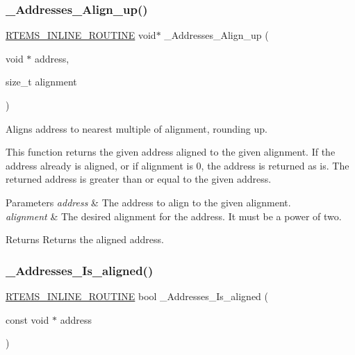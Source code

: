 \subsubsection{\texorpdfstring{\_Addresses\_Align\_up()}{\_Addresses\_Align\_up()}}
{\footnotesize\ttfamily \mbox{\hyperlink{group__RTEMSScoreBaseDefs_gac216239df231d5dbd15e3520b0b9313f}{R\+T\+E\+M\+S\+\_\+\+I\+N\+L\+I\+N\+E\+\_\+\+R\+O\+U\+T\+I\+NE}} void$\ast$ \+\_\+\+Addresses\+\_\+\+Align\+\_\+up (\begin{DoxyParamCaption}\item[{void $\ast$}]{address,  }\item[{size\+\_\+t}]{alignment }\end{DoxyParamCaption})}



Aligns address to nearest multiple of alignment, rounding up. 

This function returns the given address aligned to the given alignment. If the address already is aligned, or if alignment is 0, the address is returned as is. The returned address is greater than or equal to the given address.


\begin{DoxyParams}{Parameters}
{\em address} & The address to align to the given alignment. \\
\hline
{\em alignment} & The desired alignment for the address. It must be a power of two.\\
\hline
\end{DoxyParams}
\begin{DoxyReturn}{Returns}
Returns the aligned address. 
\end{DoxyReturn}
\mbox{\label{group__RTEMSScoreAddress_gac1cff04acb72a4eb262d66f9cd1c4d6d}} 
\subsubsection{\texorpdfstring{\_Addresses\_Is\_aligned()}{\_Addresses\_Is\_aligned()}}
{\footnotesize\ttfamily \mbox{\hyperlink{group__RTEMSScoreBaseDefs_gac216239df231d5dbd15e3520b0b9313f}{R\+T\+E\+M\+S\+\_\+\+I\+N\+L\+I\+N\+E\+\_\+\+R\+O\+U\+T\+I\+NE}} bool \+\_\+\+Addresses\+\_\+\+Is\+\_\+aligned (\begin{DoxyParamCaption}\item[{const void $\ast$}]{address }\end{DoxyParamCaption})}



